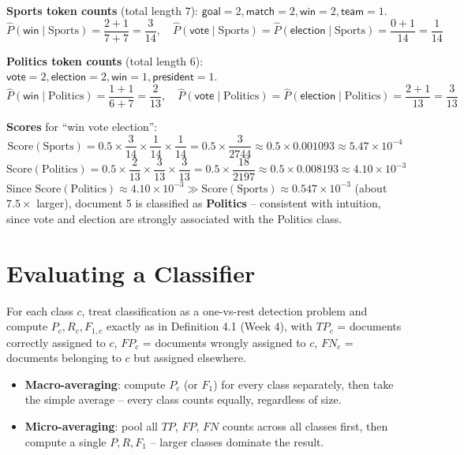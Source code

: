 \documentclass[11pt, a4paper]{article}
\begin{document}
\textbf{Sports token counts} (total length $7$): $\textsf{goal}=2,\textsf{match}=2,\textsf{win}=2,\textsf{team}=1$.
\[
\hat P(\textsf{win}\mid \text{Sports}) = \frac{2+1}{7+7}=\frac{3}{14}, \quad
\hat P(\textsf{vote}\mid \text{Sports}) = \hat P(\textsf{election}\mid \text{Sports}) = \frac{0+1}{14}=\frac1{14}
\]

\textbf{Politics token counts} (total length $6$): $\textsf{vote}=2,\textsf{election}=2,\textsf{win}=1,\textsf{president}=1$.
\[
\hat P(\textsf{win}\mid \text{Politics}) = \frac{1+1}{6+7}=\frac{2}{13}, \quad
\hat P(\textsf{vote}\mid \text{Politics}) = \hat P(\textsf{election}\mid \text{Politics}) = \frac{2+1}{13}=\frac{3}{13}
\]

\textbf{Scores} for ``win vote election'':
\[
\text{Score}(\text{Sports}) = 0.5\times\frac{3}{14}\times\frac1{14}\times\frac1{14} = 0.5\times\frac{3}{2744} \approx 0.5\times0.001093 \approx 5.47\times10^{-4}
\]
\[
\text{Score}(\text{Politics}) = 0.5\times\frac{2}{13}\times\frac{3}{13}\times\frac{3}{13} = 0.5\times\frac{18}{2197} \approx 0.5\times0.008193 \approx 4.10\times10^{-3}
\]
Since $\text{Score}(\text{Politics}) \approx 4.10\times10^{-3} \gg \text{Score}(\text{Sports}) \approx 0.547\times10^{-3}$ (about $7.5\times$ larger), document 5 is classified as \textbf{Politics} -- consistent with intuition, since \textsf{vote} and \textsf{election} are strongly associated with the Politics class.

\section{Evaluating a Classifier}

\begin{defbox}
For each class $c$, treat classification as a one-vs-rest detection problem and compute $P_c, R_c, F_{1,c}$ exactly as in Definition 4.1 (Week 4), with $TP_c$ = documents correctly assigned to $c$, $FP_c$ = documents wrongly assigned to $c$, $FN_c$ = documents belonging to $c$ but assigned elsewhere.
\begin{itemize}
  \item \textbf{Macro-averaging}: compute $P_c$ (or $F_1$) for every class separately, then take the simple average -- every class counts equally, regardless of size.
  \item \textbf{Micro-averaging}: pool all $TP$, $FP$, $FN$ counts across all classes first, then compute a single $P,R,F_1$ -- larger classes dominate the result.
\end{itemize}
\end{defbox}
\end{document}
